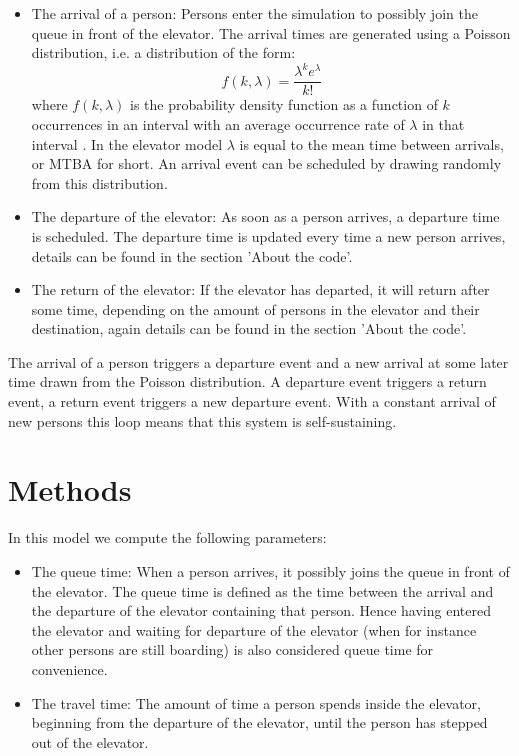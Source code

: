 \documentclass[10pt,a4paper]{article}
\begin{document}
\begin{itemize}
  \item
    The arrival of a person: Persons enter the simulation to possibly join the queue in front of the elevator. The arrival times are generated using a Poisson distribution, i.e. a distribution of the form:
    \begin{equation}
      f(k,\lambda) = \frac{\lambda^k e^\lambda}{k!}
    \end{equation}
    where $f(k,\lambda)$ is the probability density function as a function of $k$ occurrences in an interval with an average occurrence rate of $\lambda$ in that interval \cite{book}. In the elevator model $\lambda$ is equal to the mean time between arrivals, or MTBA for short. An arrival event can be scheduled by drawing randomly from this distribution.
  \item
    The departure of the elevator: As soon as a person arrives, a departure time is scheduled. The departure time is updated every time a new person arrives, details can be found in the section 'About the code'.
  \item
    The return of the elevator: If the elevator has departed, it will return after some time, depending on the amount of persons in the elevator and their destination, again details can be found in the section 'About the code'.
\end{itemize}

\noindent The arrival of a person triggers a departure event and a new arrival at some later time drawn from the Poisson distribution. A departure event triggers a return event, a return event triggers a new departure event. With a constant arrival of new persons this loop means that this system is self-sustaining.

\section{Methods}
In this model we compute the following parameters:

\begin{itemize}
  \item
    The queue time: When a person arrives, it possibly joins the queue in front of the elevator. The queue time is defined as the time between the arrival and the departure of the elevator containing that person. Hence having entered the elevator and waiting for departure of the elevator (when for instance other persons are still boarding) is also considered queue time for convenience.
  \item
    The travel time: The amount of time a person spends inside the elevator, beginning from the departure of the elevator, until the person has stepped out of the elevator.
\end{itemize}
\end{document}
